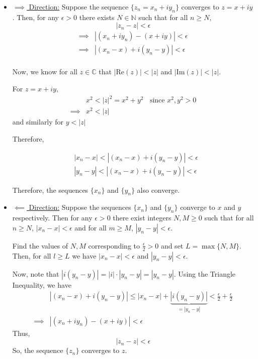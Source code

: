 \documentclass{article}
\newcommand{\C}{\mathbb{C}}
\begin{document}
\begin{itemize}
  \item \underline{$\implies$ Direction:} Suppose the sequence $\{z_n = x_n + iy_n\}$ converges to $z = x + iy$. Then, for any $\epsilon > 0$ there exists $N \in \mathbb{N}$ such that for all $n \geq N$, 
  \[ |z_n - z| < \epsilon \]
  \begin{align*}
    \implies& |(x_n + i y_n) - (x + iy)| < \epsilon \\
    \implies& |(x_n - x) + i(y_n - y)| < \epsilon \\
  \end{align*}
  
  Now, we know for all $z \in \C$ that $|\text{Re}(z)| < |z|$ and $|\text{Im}(z)| < |z|$.
  
  \begin{dottedbox}
    For $z = x + iy$, 
    \begin{align*}
      &x^2 < |z|^2 = x^2 + y^2 \;\; \text{ since $x^2, y^2 > 0$} \\
      \implies&x^2 < |z|
    \end{align*}
    and similarly for $y < |z|$
  \end{dottedbox}

  \vskip 0.5cm
  Therefore, 
  
  \begin{align*}
    &|x_n - x| < |(x_n - x) + i(y_n - y)| < \epsilon \\
    &|y_n - y| < |(x_n - x) + i(y_n - y)| < \epsilon 
  \end{align*}
  
  Therefore, the sequences $\{x_n\}$ and $\{y_n\}$ also converge.

  \vskip 0.5cm
  \item \underline{$\impliedby$ Direction:} Suppose the sequences $\{x_n\}$ and $\{y_n\}$ converge to $x$ and $y$ respectively. Then for any $\epsilon > 0$ there exist integers $N, M \geq 0$ such that for all $n \geq N$, $|x_n - x| < \epsilon$ and for all $m \geq M$, $|y_n - y| < \epsilon$.
  
  \vskip 0.5cm
  Find the values of $N, M$ corresponding to $\frac{\epsilon}{2} > 0$ and set $L = \max\{N, M\}$. Then, for all $l \geq L$ we have $|x_n - x| < \epsilon$ and $|y_n - y| < \epsilon$.

  \vskip 0.5cm
  Now, note that $|i (y_n - y)| = |i| \cdot |y_n - y| = |y_n - y|$. Using the Triangle Inequality, we have 
  \begin{align*}
    &|(x_n - x) + i(y_n - y)| \leq |x_n - x| + \underbrace{|i(y_n - y)|}_{=|y_n - y|} < \frac{\epsilon}{2} + \frac{\epsilon}{2} \\
    \implies& |(x_n + iy_n) - (x + iy) | < \epsilon
  \end{align*}
  Thus, 
  \[ \boxed{|z_n - z| < \epsilon} \]
  So, the sequence $\{z_n\}$ converges to $z$.
\end{itemize}
\end{document}
